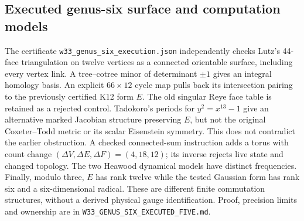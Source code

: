 \subsection{Executed genus-six surface and computation models}
The certificate \texttt{w33\_genus\_six\_execution.json} independently checks
Lutz's 44-face triangulation on twelve vertices as a connected orientable
surface, including every vertex link. A tree--cotree minor of determinant
$\pm1$ gives an integral homology basis. An explicit $66\times12$ cycle map
pulls back its intersection pairing to the previously certified K12 form $E$.
The old singular Reye face table is retained as a rejected control.
Tadokoro's periods for $y^2=x^{13}-1$ give an alternative marked Jacobian
structure preserving $E$, but not the original Coxeter--Todd metric or its
scalar Eisenstein symmetry. This does not contradict the earlier obstruction.
A checked connected-sum instruction adds a torus with count change
$(\Delta V,\Delta E,\Delta F)=(4,18,12)$; its inverse rejects live state and
changed topology. The two Heawood dynamical models have distinct frequencies.
Finally, modulo three, $E$ has rank twelve while the tested Gaussian form has
rank six and a six-dimensional radical. These are different finite
commutation structures, without a derived physical gauge identification.
Proof, precision limits and ownership are in
\texttt{W33\_GENUS\_SIX\_EXECUTED\_FIVE.md}.
